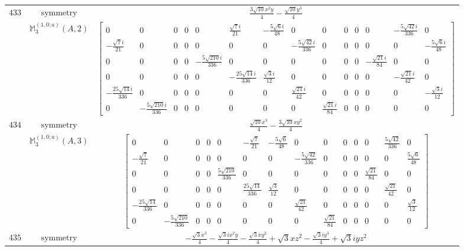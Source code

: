 \documentclass[fleqn,8pt,landscape]{jsarticle}
\begin{document}
\begin{longtable}{ccc}
$ 433 $ & $ \text{symmetry} $ & $ \frac{3 \sqrt{10} x^{2} y}{4} - \frac{\sqrt{10} y^{3}}{4} $ \\
$  $ & $ \mathbb{M}_{3}^{(1,0;a)}(A,2) $ & $ \begin{bmatrix} 0 & 0 & 0 & 0 & 0 & \frac{\sqrt{7} i}{21} & - \frac{5 \sqrt{6} i}{48} & 0 & 0 & 0 & 0 & 0 & - \frac{5 \sqrt{42} i}{336} & 0 \\ - \frac{\sqrt{7} i}{21} & 0 & 0 & 0 & 0 & 0 & 0 & - \frac{5 \sqrt{42} i}{336} & 0 & 0 & 0 & 0 & 0 & - \frac{5 \sqrt{6} i}{48} \\ 0 & 0 & 0 & 0 & - \frac{5 \sqrt{210} i}{336} & 0 & 0 & 0 & 0 & 0 & 0 & - \frac{\sqrt{21} i}{84} & 0 & 0 \\ 0 & 0 & 0 & 0 & 0 & - \frac{25 \sqrt{14} i}{336} & \frac{\sqrt{3} i}{12} & 0 & 0 & 0 & 0 & 0 & - \frac{\sqrt{21} i}{42} & 0 \\ - \frac{25 \sqrt{14} i}{336} & 0 & 0 & 0 & 0 & 0 & 0 & \frac{\sqrt{21} i}{42} & 0 & 0 & 0 & 0 & 0 & - \frac{\sqrt{3} i}{12} \\ 0 & - \frac{5 \sqrt{210} i}{336} & 0 & 0 & 0 & 0 & 0 & 0 & \frac{\sqrt{21} i}{84} & 0 & 0 & 0 & 0 & 0 \end{bmatrix} $ \\ \hline
$ 434 $ & $ \text{symmetry} $ & $ \frac{\sqrt{10} x^{3}}{4} - \frac{3 \sqrt{10} x y^{2}}{4} $ \\
$  $ & $ \mathbb{M}_{3}^{(1,0;a)}(A,3) $ & $ \begin{bmatrix} 0 & 0 & 0 & 0 & 0 & - \frac{\sqrt{7}}{21} & - \frac{5 \sqrt{6}}{48} & 0 & 0 & 0 & 0 & 0 & \frac{5 \sqrt{42}}{336} & 0 \\ - \frac{\sqrt{7}}{21} & 0 & 0 & 0 & 0 & 0 & 0 & - \frac{5 \sqrt{42}}{336} & 0 & 0 & 0 & 0 & 0 & \frac{5 \sqrt{6}}{48} \\ 0 & 0 & 0 & 0 & \frac{5 \sqrt{210}}{336} & 0 & 0 & 0 & 0 & 0 & 0 & \frac{\sqrt{21}}{84} & 0 & 0 \\ 0 & 0 & 0 & 0 & 0 & \frac{25 \sqrt{14}}{336} & \frac{\sqrt{3}}{12} & 0 & 0 & 0 & 0 & 0 & \frac{\sqrt{21}}{42} & 0 \\ - \frac{25 \sqrt{14}}{336} & 0 & 0 & 0 & 0 & 0 & 0 & \frac{\sqrt{21}}{42} & 0 & 0 & 0 & 0 & 0 & \frac{\sqrt{3}}{12} \\ 0 & - \frac{5 \sqrt{210}}{336} & 0 & 0 & 0 & 0 & 0 & 0 & \frac{\sqrt{21}}{84} & 0 & 0 & 0 & 0 & 0 \end{bmatrix} $ \\ \hline
$ 435 $ & $ \text{symmetry} $ & $ - \frac{\sqrt{3} x^{3}}{4} - \frac{\sqrt{3} i x^{2} y}{4} - \frac{\sqrt{3} x y^{2}}{4} + \sqrt{3} x z^{2} - \frac{\sqrt{3} i y^{3}}{4} + \sqrt{3} i y z^{2} $ \\

\end{longtable}
\end{document}
